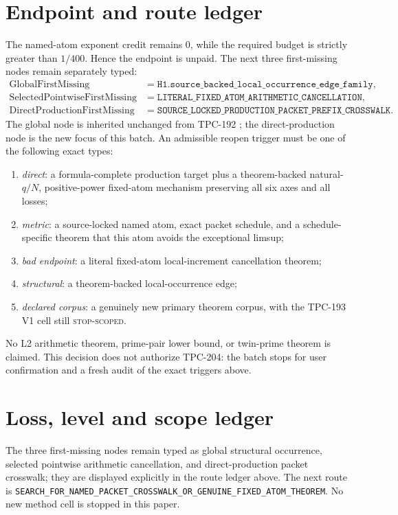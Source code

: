 \documentclass[11pt]{article}
\begin{document}
\section{Endpoint and route ledger}
The named-atom exponent credit remains \(0\), while the required budget is
strictly greater than \(1/400\).  Hence the endpoint is unpaid.  The next
three first-missing nodes remain separately typed:
\[
\begin{aligned}
\mathrm{GlobalFirstMissing}
 &=\texttt{H1.source\_backed\_local\_occurrence\_edge\_family},\\
\mathrm{SelectedPointwiseFirstMissing}
 &=\texttt{LITERAL\_FIXED\_ATOM\_ARITHMETIC\_CANCELLATION},\\
\mathrm{DirectProductionFirstMissing}
 &=\texttt{SOURCE\_LOCKED\_PRODUCTION\_PACKET\_PREFIX\_CROSSWALK}.
\end{aligned}
\]
The global node is inherited unchanged from TPC-192
\citep{WangTPC192}; the direct-production node is the new focus of this
batch.
An admissible reopen trigger must be one of the following exact types:
\begin{enumerate}
\item \emph{direct}: a formula-complete production target plus a
theorem-backed natural-\(q/N\), positive-power fixed-atom mechanism
preserving all six axes and all losses;
\item \emph{metric}: a source-locked named atom, exact packet schedule, and
a schedule-specific theorem that this atom avoids the exceptional limsup;
\item \emph{bad endpoint}: a literal fixed-atom local-increment
cancellation theorem;
\item \emph{structural}: a theorem-backed local-occurrence edge;
\item \emph{declared corpus}: a genuinely new primary theorem corpus, with
the TPC-193 V1 cell still \textsc{stop-scoped}.
\end{enumerate}
No L2 arithmetic theorem, prime-pair lower bound, or twin-prime theorem is
claimed.  This decision does not authorize TPC-204: the batch stops for user
confirmation and a fresh audit of the exact triggers above.


\section{Loss, level and scope ledger}
The three first-missing nodes remain typed as
global structural occurrence, selected pointwise arithmetic cancellation,
and direct-production packet crosswalk; they are displayed explicitly in
the route ledger above.
The next route is \texttt{SEARCH\_\allowbreak{}FOR\_\allowbreak{}NAMED\_\allowbreak{}PACKET\_\allowbreak{}CROSSWALK\_\allowbreak{}OR\_\allowbreak{}GENUINE\_\allowbreak{}FIXED\_\allowbreak{}ATOM\_\allowbreak{}THEOREM}.
No new method cell is stopped in this paper.
\end{document}
